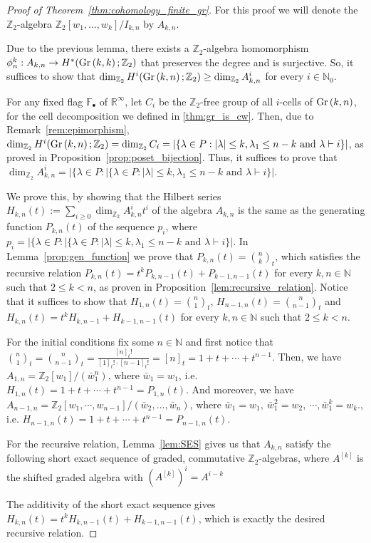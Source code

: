 \begin{proof}[Proof of Theorem~\ref{thm:cohomology_finite_gr}] For this proof we will denote the $\mathbb{Z}_2$-algebra $\mathbb{Z}_2[w_1,\ldots,w_k]/I_{k,n}$ by $A_{k,n}$.

Due to the previous lemma, there exists a $\mathbb{Z}_2$-algebra homomorphism $\phi_n^k:A_{k,n}\to H^*(\Gr{k}{k};\mathbb{Z}_2)$ that preserves the degree and is surjective. So, it suffices to show that $\dim_{\mathbb{Z}_2}H^i(\Gr{k}{n};\mathbb{Z}_2)\geq\dim_{\mathbb{Z}_2}A_{k,n}^i$ for every $i\in\mathbb{N}_0$.

For any fixed flag $\mathbb{F}_{\bullet}$ of $\mathbb{R}^{\infty}$, let $C_i$ be the $\mathbb{Z}_2$-free group of all $i$-cells of $\Gr{k}{n}$, for the cell decomposition we defined in \ref{thm:gr_is_cw}. Then, due to Remark~\ref{rem:epimorphism},  $\dim_{\mathbb{Z}_2}H^i(\Gr{k}{n};\mathbb{Z}_2)=\dim_{\mathbb{Z}_2}C_i=|\{\lambda\in P:|\lambda|\leq k,\lambda_1\leq n-k\text{ and }\lambda\vdash i\}|$, as proved in Proposition~\ref{prop:poset_bijection}. Thus, it suffices to prove that $\dim_{\mathbb{Z}_2}A_{k,n}^i=|\{\lambda\in P:|\{\lambda\in P:|\lambda|\leq k,\lambda_1\leq n-k\text{ and }\lambda\vdash i\}|$.

We prove this, by showing that the Hilbert series $H_{k,n}(t):=\sum_{i\geq0}\dim_{\mathbb{Z}_2}A_{k,n}^it^i$ of the algebra $A_{k,n}$ is the same as the generating function $P_{k,n}(t)$ of the sequence $p_i$, where $p_i=|\{\lambda\in P:|\{\lambda\in P:|\lambda|\leq k,\lambda_1\leq n-k\text{ and }\lambda\vdash i\}|$. In Lemma~\ref{prop:gen_function} we prove that $P_{k,n}(t)=\binom{n}{k}_t$, which satisfies the recursive relation $P_{k,n}(t)=t^kP_{k,n-1}(t)+P_{k-1,n-1}(t)$ for every $k,n\in\mathbb{N}$ such that $2\leq k<n$, as proven in Proposition~\ref{lem:recursive_relation}. Notice that it suffices to show that $H_{1,n}(t)=\binom{n}{1}_t$, $H_{n-1,n}(t)=\binom{n}{n-1}_t$ and $H_{k,n}(t)=t^kH_{k,n-1}+H_{k-1,n-1}(t)$ for every $k,n\in\mathbb{N}$ such that $2\leq k<n$.

For the initial conditions fix some $n\in\mathbb{N}$ and first notice that $\binom{n}{1}_t=\binom{n}{n-1}_t=\frac{[n]_t!}{[1]_t!\cdot[n-1]_t!}=[n]_t=1+t+\cdots+t^{n-1}$. Then, we have $A_{1,n}=\mathbb{Z}_2[w_1]/(\bar{w}_1^n)$, where $\bar{w}_1=w_1$, i.e. $H_{1,n}(t)=1+t+\cdots+t^{n-1}=P_{1,n}(t)$. And moreover, we have $A_{n-1,n}=\mathbb{Z}_2[w_1,\cdots,w_{n-1}]/(\bar{w}_2,\ldots,\bar{w}_n)$, where $\bar{w}_1=w_1,\  \bar{w}_1^2=w_2,\ \cdots,\bar{w}_1^k=w_k$., i.e. $H_{n-1,n}(t)=1+t+\cdots+t^{n-1}=P_{n-1,n}(t)$.

For the recursive relation, Lemma~\ref{lem:SES} gives us that $A_{k,n}$ satisfy the following short exact sequence of graded, commutative $\mathbb{Z}_2$-algebras, where $A^{[k]}$ is the shifted graded algebra with $(A^{[k]})^i=A^{i-k}$
\begin{center}
\end{center}
The additivity of the short exact sequence gives $H_{k,n}(t)=t^kH_{k,n-1}(t)+H_{k-1,n-1}(t)$, which is exactly the desired recursive relation.
\end{proof}

